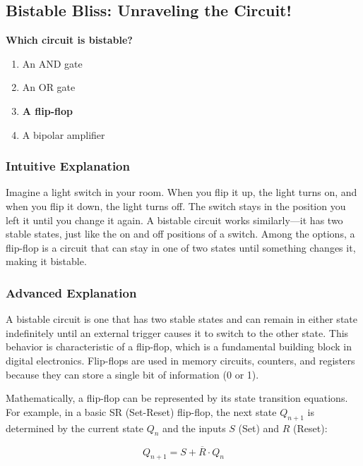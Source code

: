 \subsection{Bistable Bliss: Unraveling the Circuit!}

\begin{tcolorbox}[colback=gray!10!white,colframe=black!75!black,title=\textbf{E7A01}]
\textbf{Which circuit is bistable?}
\begin{enumerate}[label=\Alph*),noitemsep]
    \item An AND gate
    \item An OR gate
    \item \textbf{A flip-flop}
    \item A bipolar amplifier
\end{enumerate}
\end{tcolorbox}

\subsubsection{Intuitive Explanation}
Imagine a light switch in your room. When you flip it up, the light turns on, and when you flip it down, the light turns off. The switch stays in the position you left it until you change it again. A bistable circuit works similarly—it has two stable states, just like the on and off positions of a switch. Among the options, a flip-flop is a circuit that can stay in one of two states until something changes it, making it bistable.

\subsubsection{Advanced Explanation}
A bistable circuit is one that has two stable states and can remain in either state indefinitely until an external trigger causes it to switch to the other state. This behavior is characteristic of a flip-flop, which is a fundamental building block in digital electronics. Flip-flops are used in memory circuits, counters, and registers because they can store a single bit of information (0 or 1).

Mathematically, a flip-flop can be represented by its state transition equations. For example, in a basic SR (Set-Reset) flip-flop, the next state \( Q_{n+1} \) is determined by the current state \( Q_n \) and the inputs \( S \) (Set) and \( R \) (Reset):

\[
Q_{n+1} = S + \overline{R} \cdot Q_n
\]

